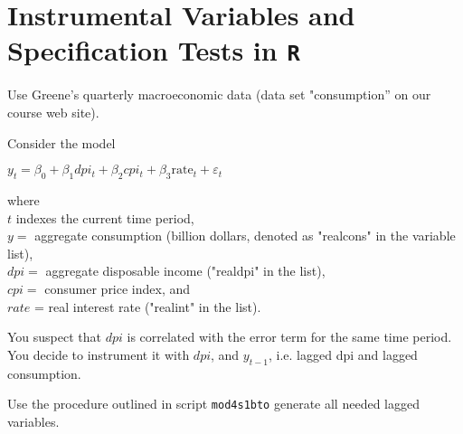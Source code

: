 \documentclass[11pt,reqno]{amsart}\usepackage[]{graphicx}\usepackage[]{color}
\newcommand{\kR}{\tt R\rm{} }%
\begin{document}
\section{Instrumental Variables and Specification Tests in \kR}

Use Greene's quarterly macroeconomic data (data set "consumption” on our course web site).


Consider the model  


$y_{t}=\beta_{0}+\beta_{1} dpi_{t}+\beta_{2} cpi_{t}+\beta_{3} \text {rate}_{t}+\varepsilon_{t}$

where \\
$t$ indexes the current time period, \\
$y=$ aggregate consumption (billion dollars, denoted as "realcons" in the variable list),\\
$dpi=$ aggregate disposable income ("realdpi" in the list), \\
$cpi=$ consumer price index, and \\
$rate$ = real interest rate ("realint" in the list).

You suspect that $dpi$ is correlated with the error term for the same time period. You decide to instrument it with $dpi$, and $y_{t-1}$, i.e. lagged dpi and lagged consumption.

Use the procedure outlined in script \texttt{mod4s1bto} generate all needed lagged variables.
\end{document}
